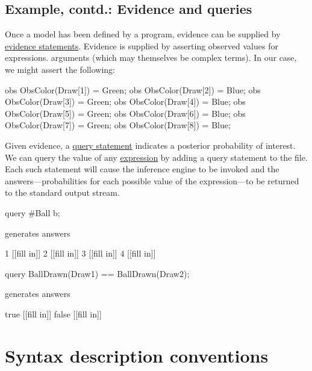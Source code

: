 \documentclass[12pt]{article}
\begin{document}
\subsection{Example, contd.: Evidence and queries}

Once a model has been defined by a \bl program, evidence can be
supplied by \hyperref[evidence-section]{evidence statements}.  
Evidence is supplied by asserting observed values for expressions.
arguments (which may themselves be complex terms). In our case, we might 
assert the following:
\begin{blogcode}
obs ObsColor(Draw[1]) = Green;
obs ObsColor(Draw[2]) = Blue;
obs ObsColor(Draw[3]) = Green;
obs ObsColor(Draw[4]) = Blue;
obs ObsColor(Draw[5]) = Green;
obs ObsColor(Draw[6]) = Blue;
obs ObsColor(Draw[7]) = Green;
obs ObsColor(Draw[8]) = Blue;
\end{blogcode}
Given
evidence, a \hyperref[query-section]{query statement} indicates a
posterior probability of interest. We can query the value of any \hyperref[expression-section]{expression}
by adding a query statement to the file. Each such statement will cause the inference engine to be invoked 
and the answers---probabilities for each possible value of the
expression---to be returned to the standard output stream.
\begin{blogcode}
query #{Ball b};
\end{blogcode}
generates answers
\begin{blogcode}
1 [[fill in]]
2 [[fill in]]
3 [[fill in]]
4 [[fill in]]
\end{blogcode}
\begin{blogcode}
query BallDrawn(Draw1) == BallDrawn(Draw2);
\end{blogcode}
generates answers
\begin{blogcode}
true [[fill in]]
false [[fill in]]
\end{blogcode}


\section{Syntax description conventions}\label{convention-section}
\end{document}
